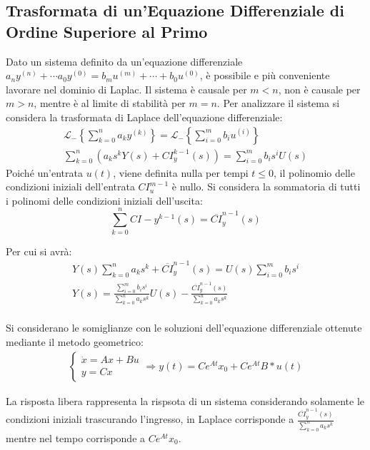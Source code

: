 \documentclass{article}
\numberwithin{equation}{subsection}
\begin{document}
\subsection{Trasformata di un'Equazione Differenziale di Ordine Superiore al Primo}

Dato un sistema definito da un'equazione differenziale $a_ny^{(n)}+\cdots a_0y^{(0)}=b_mu^{(m)}+\cdots+b_0u^{(0)}$, è possibile e più conveniente lavorare nel dominio di 
Laplac. Il sistema è causale per $m<n$, non è causale per $m>n$, mentre è al limite di stabilità per $m=n$. Per analizzare il sistema si considera la trasformata di Laplace 
dell'equazione differenziale:
\begin{gather}
    \mathscr{L}_-\left\{\displaystyle\sum_{k=0}^{n}a_ky^{(k)}\right\}=\mathscr{L}_-\left\{\sum_{i=0}^{m}b_iu^{(i)}\right\}\\
    \displaystyle\sum_{k=0}^{n}\left(a_ks^kY(s)+CI_y^{k-1}(s)\right)=\sum_{i=0}^{m}b_is^iU(s)
\end{gather}
Poiché un'entrata $u(t)$, viene definita nulla per tempi $t\leq0$, il polinomio delle condizioni iniziali dell'entrata $CI_u^{m-1}$ è nullo. Si considera la sommatoria 
di tutti i polinomi delle condizioni iniziali dell'uscita:
\begin{equation}
    \displaystyle\sum_{k=0}^{n}CI-y^{k-1}(s)=\overline{CI}_y^{n-1}(s)
\end{equation}

Per cui si avrà:
\begin{gather}
    Y(s)\displaystyle\sum_{k=0}^{n}a_ks^k+\overline{CI}_y^{n-1}(s)=U(s)\sum_{i=0}^{m}b_is^i\\
    Y(s)=\displaystyle\frac{\sum_{i=0}^{m}b_is^i}{\sum_{k=0}^{n}a_ks^k}U(s)-\frac{\overline{CI}_y^{n-1}(s)}{\sum_{k=0}^{n}a_ks^k}\\
\end{gather}

Si considerano le somiglianze con le soluzioni dell'equazione differenziale ottenute mediante il metodo geometrico:
\begin{gather}
    \begin{cases}
        \dot x=Ax+Bu\\
        y=Cx
    \end{cases}\Rightarrow
    y(t)=Ce^{At}x_0+Ce^{At}B*u(t)
\end{gather}

La risposta libera rappresenta la rispsota di un sistema considerando solamente le condizioni iniziali trascurando l'ingresso, in Laplace corrisponde a 
$\displaystyle\frac{\overline{CI}_y^{n-1}(s)}{\sum_{k=0}^{n}a_ks^k}$ mentre nel tempo corrisponde a $Ce^{At}x_0$. 
\end{document}
